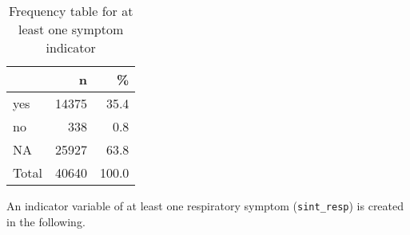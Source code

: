 \documentclass[
]{article}
\begin{document}
\begin{table}[!h]

\caption{\label{tab:unnamed-chunk-75}Frequency table for at least one symptom indicator}
\centering
\begin{tabular}[t]{l|r|r}
\hline
  & n & \%\\
\hline
yes & 14375 & 35.4\\
\hline
no & 338 & 0.8\\
\hline
NA & 25927 & 63.8\\
\hline
Total & 40640 & 100.0\\
\hline
\end{tabular}
\end{table}

An indicator variable of at least one respiratory symptom
(\texttt{sint\_resp}) is created in the following.
\end{document}
